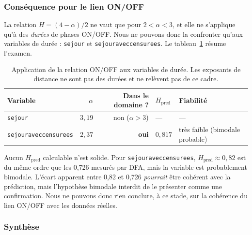 \documentclass[11pt,a4paper]{article}
\newcommand{\code}[1]{\texttt{#1}}
\renewcommand{\_}{\textunderscore\penalty0\hspace{0pt}}
\begin{document}
\subsubsection{Conséquence pour le lien ON/OFF}

La relation $H = (4-\alpha)/2$ ne vaut que pour $2 < \alpha < 3$, et elle ne s'applique
qu'à des \emph{durées} de phases ON/OFF. Nous ne pouvons donc la confronter qu'aux
variables de durée : \code{sejour} et \code{sejour\_avec\_censurees}. Le
tableau~\ref{tab:onoff-applique} résume l'examen.

\begin{table}[ht]
\centering
\caption{Application de la relation ON/OFF aux variables de durée. Les exposants de
distance ne sont pas des durées et ne relèvent pas de ce cadre.}
\label{tab:onoff-applique}
\small
\begin{tabular}{lrrll}
\toprule
Variable & $\alpha$ & Dans le domaine ? & $H_{\text{pred}}$ & Fiabilité \\
\midrule
\code{sejour} & $3{,}19$ & non ($\alpha > 3$) & --- & --- \\
\code{sejour\_avec\_censurees} & $2{,}37$ & \textbf{oui} & $0{,}817$ & très faible (bimodale probable) \\
\bottomrule
\end{tabular}
\end{table}

Aucun $H_{\text{pred}}$ calculable n'est solide. Pour \code{sejour\_avec\_censurees},
$H_{\text{pred}} \approx 0{,}82$ est du même ordre que les 0,726 mesurés par DFA, mais
la variable est probablement bimodale. L'écart apparent entre 0,82 et 0,726
\emph{pourrait} être cohérent avec la prédiction, mais l'hypothèse bimodale interdit de
le présenter comme une confirmation. Nous ne pouvons donc rien conclure, à ce stade, sur
la cohérence du lien ON/OFF avec les données réelles.

\subsubsection{Synthèse}
\end{document}
